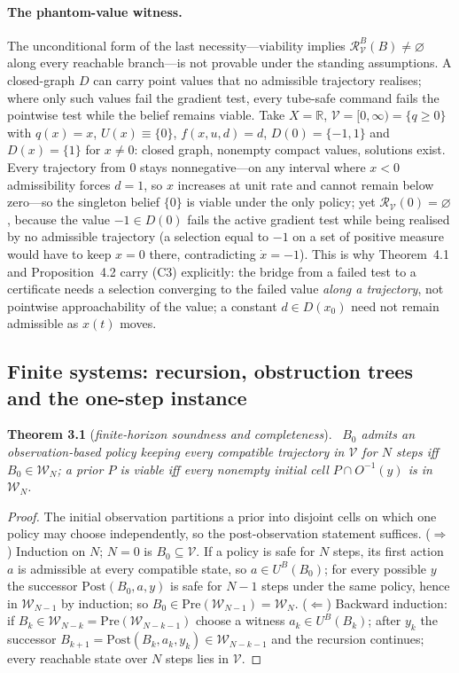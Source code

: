 \documentclass[11pt,a4paper]{article}
\theoremstyle{plain}
\theoremstyle{definition}
\theoremstyle{remark}
\newenvironment{restated}[2]{\par\medskip\noindent\textbf{#1} (\textit{#2}).\ \itshape}{\par\medskip}
\newcommand{\R}{\mathbb{R}}
\newcommand{\cV}{\mathcal{V}}
\newcommand{\cR}{\mathcal{R}}
\newcommand{\cW}{\mathcal{W}}
\newcommand{\Post}{\mathrm{Post}}
\newcommand{\Pre}{\mathrm{Pre}}
\newcommand{\hyp}[1]{\textup{(#1)}}
\begin{document}
\paragraph{The phantom-value witness.}\label{S:phantom}
The unconditional form of the last necessity---viability implies $\cR^B_\cV(B)\ne\varnothing$ along every reachable branch---is not provable under the standing assumptions. A closed-graph $D$ can carry point values that no admissible trajectory realises; where only such values fail the gradient test, every tube-safe command fails the pointwise test while the belief remains viable. Take $X=\R$, $\cV=[0,\infty)=\{q\ge0\}$ with $q(x)=x$, $U(x)\equiv\{0\}$, $f(x,u,d)=d$, $D(0)=\{-1,1\}$ and $D(x)=\{1\}$ for $x\ne0$: closed graph, nonempty compact values, solutions exist. Every trajectory from $0$ stays nonnegative---on any interval where $x<0$ admissibility forces $d=1$, so $x$ increases at unit rate and cannot remain below zero---so the singleton belief $\{0\}$ is viable under the only policy; yet $\cR_\cV(0)=\varnothing$, because the value $-1\in D(0)$ fails the active gradient test while being realised by no admissible trajectory (a selection equal to $-1$ on a set of positive measure would have to keep $x=0$ there, contradicting $\dot x=-1$). This is why Theorem~4.1 and Proposition~4.2 carry \hyp{C3} explicitly: the bridge from a failed test to a certificate needs a selection converging to the failed value \emph{along a trajectory}, not pointwise approachability of the value; a constant $d\in D(x_0)$ need not remain admissible as $x(t)$ moves.

\subsection{Finite systems: recursion, obstruction trees and the one-step instance}\label{S:trees}

\begin{restated}{Theorem 3.1}{finite-horizon soundness and completeness}
$B_0$ admits an observation-based policy keeping every compatible trajectory in $\cV$ for $N$ steps iff $B_0\in\cW_N$; a prior $P$ is viable iff every nonempty initial cell $P\cap O^{-1}(y)$ is in $\cW_N$.
\end{restated}

\begin{proof}
The initial observation partitions a prior into disjoint cells on which one policy may choose independently, so the post-observation statement suffices. ($\Rightarrow$) Induction on $N$; $N=0$ is $B_0\subseteq\cV$. If a policy is safe for $N$ steps, its first action $a$ is admissible at every compatible state, so $a\in U^B(B_0)$; for every possible $y$ the successor $\Post(B_0,a,y)$ is safe for $N-1$ steps under the same policy, hence in $\cW_{N-1}$ by induction; so $B_0\in\Pre(\cW_{N-1})=\cW_N$. ($\Leftarrow$) Backward induction: if $B_k\in\cW_{N-k}=\Pre(\cW_{N-k-1})$ choose a witness $a_k\in U^B(B_k)$; after $y_k$ the successor $B_{k+1}=\Post(B_k,a_k,y_k)\in\cW_{N-k-1}$ and the recursion continues; every reachable state over $N$ steps lies in $\cV$.
\end{proof}
\end{document}

